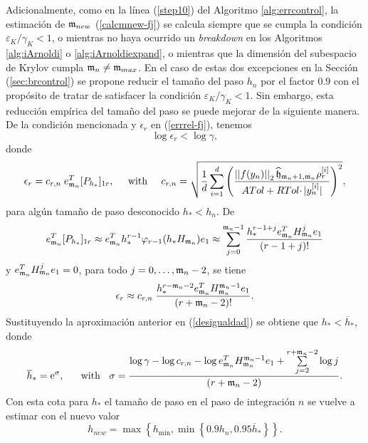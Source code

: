  Adicionalmente, como en la línea (\ref{step10}) del Algoritmo \ref{alg:errcontrol}, la estimación de $\mathfrak{m}_{new}$ (\ref{calcmnew-fj}) se calcula siempre que se cumpla la condición $\varepsilon_{K}/\gamma_{K}< 1 $, o mientras no haya ocurrido un \textit{breakdown} en los Algoritmos \ref{alg:iArnoldi} o \ref{alg:iArnoldiexpand}, o mientras que la dimensión del subespacio de Krylov cumpla $\mathfrak{m}_n\neq\mathfrak{m}_{max}$. En el caso de estas dos excepciones en la Sección (\ref{sec:brcontrol}) se propone reducir el tamaño del paso $h_n$ por el factor $0\mathord{.}9$ con el propósito de tratar de satisfacer la condición $\varepsilon_{K}/\gamma_{K}< 1$. Sin embargo, esta reducción empírica del tamaño del paso se puede mejorar de la siguiente manera. De la condición mencionada y $\epsilon_{r}$ en (\ref{errrel-fj}), tenemos
	\begin{equation}\label{desigualdad}
		\log{\epsilon_{r}}<\log{\gamma},
	\end{equation}
	donde
	\begin{equation*}
		\epsilon _{r} = c_{r,n} \; e_{\mathfrak{m}_n}^{T}[P_{h_*}]_{1r}, \;\;\;\;\; \text{with} \;\;\;\;\; c_{r,n}=\sqrt{\frac{1}{d}\sum\limits_{i=1}^{d}\left( \frac{	\left\lvert \left\lvert f(y_n) \right\rvert \right\rvert_{2}\widehat{\mathfrak{h}}_{\mathfrak{m}_n+1,\mathfrak{m}_n}\rho _{r}^{[i]}}{ATol+RTol \cdotp\rvert y_{n}^{[i]}\rvert }\right) ^{2}},
	\end{equation*}
	para algún tamaño de paso desconocido $h_*<h_n$. De
	\begin{equation*}
		e_{\mathfrak{m}_n}^{T}[P_{h_*}]_{1r} \approx e_{\mathfrak{m}_n}^{T}h_*^{r-1}\varphi
		_{r-1}(h_*H_{\mathfrak{m}_n})e_{1} \approx \sum\limits_{j=0}^{\mathfrak{m}_n-1} \frac{ h_*^{r-1+j} e_{\mathfrak{m}_n}^T H_{\mathfrak{m}_n}^{j} e_1}{(r-1+j)!}
	\end{equation*}
	y $e_{\mathfrak{m}_n}^{T}H_{\mathfrak{m}_n}^{j}e_{1}=0$, para todo $j=0,\ldots,\mathfrak{m}_n-2$, se tiene
	\begin{equation*}
		\epsilon _{r} \approx c_{r,n} \; \frac{h_*^{r-\mathfrak{m}_n-2} e_{\mathfrak{m}_n}^T H_{\mathfrak{m}_n}^{\mathfrak{m}_n-1} e_1}{(r+\mathfrak{m}_n-2)!}.
	\end{equation*}
	Sustituyendo la aproximación anterior en (\ref{desigualdad}) se obtiene que $h_*<\overline{h}_*$, donde
    \[ \overline{h}_* = \mathrm{e}^{\sigma},   \;\;\;\;\;\;  \text{with }  \;\;  \sigma=\dfrac{ \log{\gamma} - \log{c_{r,n}} -\log{e_{\mathfrak{m}_n}^T H_{\mathfrak{m}_n}^{\mathfrak{m}_n-1} e_1}+\sum\limits_{j=2}^{r+\mathfrak{m}_n-2}\log{j}}{(r+\mathfrak{m}_n-2)}. \]
	Con esta cota para $h_*$ el tamaño de paso en el paso de integración $n$ se vuelve a estimar con el nuevo valor
	\begin{equation}
		h_{new} = \max \left\{ h_{\min }, \min \left\{ 0\mathord{.}9h_n,0\mathord{.}95\overline{h}_*\right\} \right\}.\label{hnew}
	\end{equation}


